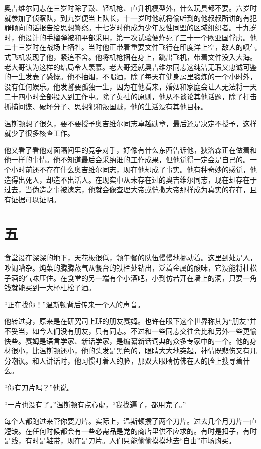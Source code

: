奥吉维尔同志在三岁时除了鼓、轻机枪、直升机模型外，什么玩具都不要。六岁时就参加了侦察队，到九岁便当上队长，十一岁时他就将偷听到的他叔叔所讲的有犯罪倾向的话报告给思想警察。十七岁时他成为少年反性同盟的区域组织者。十九岁时，他设计的手榴弹被和平部采用，第一次试验便炸死了三十一个欧亚国俘虏。他二十三岁时在战场上牺牲。当时他正带着重要文件飞行在印度洋上空，敌人的喷气式飞机发现了他，紧追不舍。他将机枪捆在身上，跳出飞机，带着文件没入大海。老大哥认为这样的结局令人羡慕。老大哥还就奥吉维尔同志这纯洁无瑕又忠诚可鉴的一生发表了感慨。他不抽烟，不喝酒，除了每天在健身房里锻炼的一个小时外，没有任何娱乐。他发誓要孤独一生，因为在他看来，婚姻和家庭会让人无法将一天二十四小时全部投入到工作中。除了英社的原则，他从不谈论其他话题，除了打击抓捕间谍、破坏分子、思想犯和叛国贼，他的生活没有其他目标。

温斯顿想了很久，要不要授予奥吉维尔同志卓越勋章，最后还是决定不授予，这样就少了很多核查工作。

他又看了看他对面隔间里的竞争对手，好像有什么东西告诉他，狄洛森正在做着和他一样的事情。他不知道最后会采纳谁的工作成果，但他觉得一定会是自己的。一个小时前还不存在什么奥吉维尔同志，现在他却成了事实。他有种奇妙的感觉，他造得出死人，却造不出活人。在现实中从未存在过的奥吉维尔同志，现在却存在于过去，当伪造之事被遗忘，他就会像查理大帝或恺撒大帝那样成为真实的存在，且有证据可以证明。

\section*{五}\label{ux4e94}

食堂设在深深的地下，天花板很低，领午餐的队伍慢慢地挪动着。这里到处是人，吵闹嘈杂。炖菜的腾腾蒸气从餐台的铁栏处钻出，泛着金属的酸味，它没能将杜松子酒的气味压住。在食堂的另一端有个小酒吧，小到仿若开在墙上的洞，只要一角钱就能买到一大杯杜松子酒。

``正在找你！''温斯顿背后传来一个人的声音。

他转过身，原来是在研究司上班的朋友赛姆。也许在眼下这个世界称其为``朋友''并不妥当，如今人们没有朋友，只有同志。不过和一些同志交往会比和另外一些更愉快些。赛姆是语言学家、新话学家，是编纂新话词典的众多专家中的一个。他的身材很小，比温斯顿还小，他的头发是黑色的，眼睛大大地突起，神情既悲伤又有几分嘲讽。和人讲话时，他习惯盯着人的脸，那双大眼睛仿佛在人的脸上搜寻着什么。

``你有刀片吗？''他说。

``一片也没有了。''温斯顿有点心虚，``我找遍了，都用完了。''

每个人都跑过来管你要刀片。实际上，温斯顿攒了两个刀片。过去几个月刀片一直短缺。在任何时候都会有一些必需品是党的商店里供不应求的。有时是扣子，有时是线，有时是鞋带，现在是刀片。人们只能偷偷摸摸地去``自由''市场购买。

